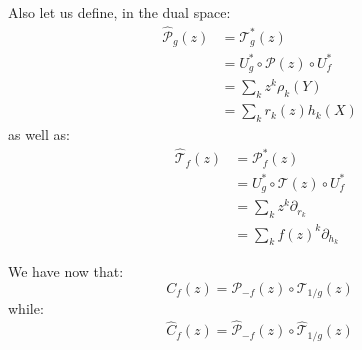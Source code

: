 \documentclass[12pt,dvips]{amsart}
\begin{document}
\par\bigskip
Also let us define, in the dual space:
\begin{align*}
\hat{\mathcal{P}}_{g}(z) & =  \mathcal{T}_g^*(z) \\
& =  U_g^* \circ \mathcal{P}(z) \circ U_f^* \\
& =  \sum_k z^k \rho_k(Y) \\
& =  \sum_k r_k(z) h_k(X)
\end{align*}
as well as:
\begin{align*}
\hat{\mathcal{T}}_{f}(z) & =  \mathcal{P}_f^*(z) \\
& =  U^*_g \circ \mathcal{T}(z) \circ U^*_f \\
& =  \sum_k z^k \partial_{r_k} \\
& =  \sum_k f(z)^k \partial_{h_k}
\end{align*}

\par\bigskip
We have now that:
$$ {C}_f(z) = \mathcal{P}_{-f}(z) \circ \mathcal{T}_{1/g}(z)$$
while:
$$ \hat{C}_f(z) = \hat{\mathcal{P}}_{-f}(z) \circ \hat{\mathcal{T}}_{1/g}(z) $$
\end{document}
